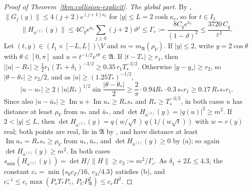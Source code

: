 \documentclass[11pt]{amsart}
\theoremstyle{definition}
\theoremstyle{remark}
\numberwithin{equation}{section}
\newcommand{\eps}{\varepsilon}
\DeclareMathOperator{\im}{Im}
\begin{document}
\begin{proof}[Proof of Theorem~\ref{thm:collision-explicit}]
\emph{The global part.} By \cite[Lemma~\ref{M-lem:transfer}]{Main}, $\|G_j(y)\|\le4(j+2)e^{(j+1)\kappa_c}$ for $|y|\le L=2\cosh\kappa_c$, so for $t\in I_1$
\[
\|H_{a^{(t)}}(y)\|\le4C_qe^{\kappa_c}\sum_{j\ge0}(j+2)\vartheta^j\le\Gamma_c:=\frac{8C_qe^{\kappa_c}}{(1-\vartheta)^2}\le\frac{3720\,C_q}{\eps^2}.
\]
Let $(t,y)\in(I_1\times[-L,L])\setminus V$ and $m=m_{\mathfrak A}(\rho_V)$. If $|y|\le2$, write $y=2\cos\theta$ with $\theta\in[0,\pi]$ and $u=t^{-1/2}e^{i\theta}\in\mathfrak A$. If $|t-T_*|\ge r_1$, then $\bigl||u|-R_*\bigr|\ge\frac12r_1(T_*+\delta_1)^{-3/2}\ge0.35\,r_1T_*^{-3/2}$. Otherwise $|y-y_*|\ge r_2$, so $|\theta-\theta_*|\ge r_2/2$, and as $|u|\ge(1.25T_*)^{-1/2}$,
\[
|u-u_*|\ge2(|u|R_*)^{1/2}\sin\frac{|\theta-\theta_*|}2\ge\frac2\pi\cdot0.94R_*\cdot0.3\,s_*r_1\ge0.17\,R_*s_*r_1 .
\]
Since also $|u-\bar u_*|\ge\im u+\im u_*\ge R_*s_*$ and $R_*\ge T_*^{-3/2}$, in both cases $u$ has distance at least $\rho_V$ from $u_*$ and $\bar u_*$, and $\det H_{a^{(t)}}(y)=|q(u)|^2\ge m^2$. If $2<|y|\le L$, then $\det H_{a^{(t)}}(y)=q(w/\sqrt t)\,q(1/(w\sqrt t))$ with $w=r(y)$ real; both points are real, lie in $\mathfrak A$ by \cite[\eqref{M-eq:collision-kappa}]{Main}, and have distance at least $\im u_*=R_*s_*\ge\rho_V$ from $u_*,\bar u_*$, and $\det H_{a^{(t)}}(y)\ge0$ by \cite[Lemma~\ref{M-lem:degenerate}]{Main}(a); so again $\det H_{a^{(t)}}(y)\ge m^2$. In both cases $s_{\min}(H_{a^{(t)}}(y))=\det H/\|H\|\ge c_3:=m^2/\Gamma_c$. As $\delta_1+2L\le4.3$, the constant $c_*=\min\{s_0c_F/16,\ c_3/4.3\}$ satisfies \cite[Lemma~\ref{M-lem:degenerate}]{Main}(b), and $c_*^{-1}\le c_\eps\max(P_sT_*P_\gamma,\ P_CP_{\mathfrak A}^2)\le c_\eps\Pi^2$.


\end{proof}
\end{document}
